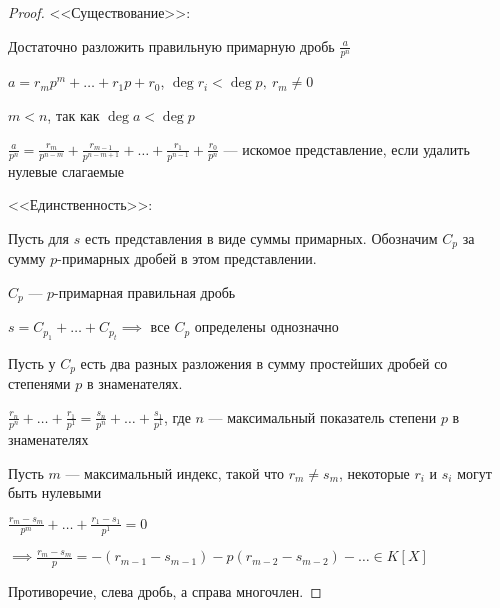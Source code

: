 \begin{proof}

    <<Существование>>:

    Достаточно разложить правильную примарную дробь $\frac{a}{p^n}$

    $a = r_mp^m + \ldots + r_1p + r_0$, $\deg r_i < \deg p,~r_m \neq 0$

    $m < n$, так как $\deg a < \deg p$

    $\frac{a}{p^n} = \frac{r_m}{p^{n - m}} + \frac{r_{m-1}}{p^{n - m + 1}} + \ldots + \frac{r_1}{p^{n - 1}} + \frac{r_0}{p^n}$ --- искомое представление, если удалить нулевые слагаемые

    <<Единственность>>:

    Пусть для $s$ есть представления в виде суммы примарных. Обозначим $C_p$ за сумму $p$-примарных дробей в этом представлении.

    $C_p$ --- $p$-примарная правильная дробь

    $s = C_{p_1} + \ldots + C_{p_t} \implies$ все $C_p$ определены однозначно
    
    Пусть у $C_p$ есть два разных разложения в сумму простейших дробей со степенями $p$ в знаменателях.

    $\frac{r_n}{p^n} + \ldots + \frac{r_1}{p^1} = \frac{s_n}{p^n} + \ldots + \frac{s_1}{p^1}$, где $n$ --- максимальный показатель степени $p$ в знаменателях

    Пусть $m$ --- максимальный индекс, такой что $r_m \neq s_m$, некоторые $r_i$ и $s_i$ могут быть нулевыми

    $\frac{r_m - s_m}{p^m} + \ldots + \frac{r_1 - s_1}{p^1} = 0$

    $\implies \frac{r_m - s_m}{p} = -(r_{m-1} - s_{m-1}) - p (r_{m-2} - s_{m-2}) - \ldots \in K[X]$

    Противоречие, слева дробь, а справа многочлен.
\end{proof}